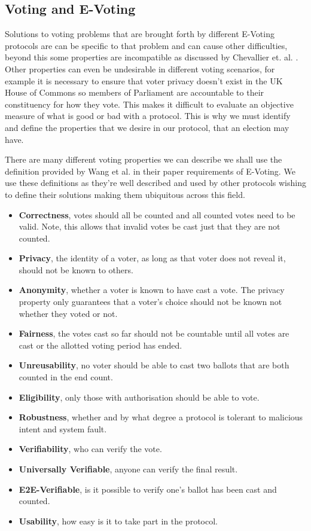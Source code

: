 \documentclass{entcs}
\begin{document}
\subsection{Voting and E-Voting} \label{sec:voting}
Solutions to voting problems that are brought forth by different E-Voting protocols are can be specific to that problem and can cause other difficulties, beyond this some properties are incompatible as discussed by Chevallier et. al. \cite{Chevallier-mames06onsome}. Other properties can even be undesirable in different voting scenarios, for example it is necessary to ensure that voter privacy doesn't exist in the UK House of Commons so members of Parliament are accountable to their constituency for how they vote. This makes it difficult to evaluate an objective measure of what is good or bad with a protocol. This is why we must identify and define the properties that we desire in our protocol, that an election may have.

There are many different voting properties we can describe we shall use the definition provided by Wang et al. \cite{RequirementOfEVoting} in their paper requirements of E-Voting. We use these definitions as they're well described and used by other protocols wishing to define their solutions making them ubiquitous across this field.
\begin{itemize}
  \item {\bfseries Correctness}, votes should all be counted and all counted votes need to be valid. Note, this allows that invalid votes be cast just that they are not counted.
  \item {\bfseries Privacy}, the identity of a voter, as long as that voter does not reveal it, should not be known to others.
  \item {\bfseries Anonymity}, whether a voter is known to have cast a vote. The privacy property only guarantees that a voter's choice should not be known not whether they voted or not.
  \item {\bfseries Fairness}, the votes cast so far should not be countable until all votes are cast or the allotted voting period has ended.
  \item {\bfseries Unreusability}, no voter should be able to cast two ballots that are both counted in the end count.
  \item {\bfseries Eligibility}, only those with authorisation should be able to vote.
  \item {\bfseries Robustness}, whether and by what degree a protocol is tolerant to malicious intent and system fault.
  \item {\bfseries Verifiability}, who can verify the vote.
  \item {\bfseries Universally Verifiable}, anyone can verify the final result. 
  \item {\bfseries E2E-Verifiable}, is it possible to verify one's ballot has been cast and counted.
  \item {\bfseries Usability}, how easy is it to take part in the protocol.
\end{itemize}
\end{document}
